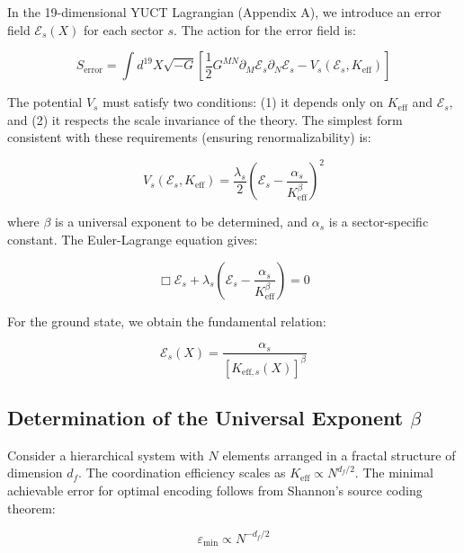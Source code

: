 \documentclass[12pt,a4paper]{article}
\theoremstyle{remark}
\newcommand{\Keff}{K_{\mathrm{eff}}}
\newcommand{\eps}{\varepsilon}
\newcommand{\df}{d_{\!f}}
\begin{document}
	In the 19-dimensional YUCT Lagrangian (Appendix A), we introduce an error field $\mathcal{E}_s(X)$ for each sector $s$. The action for the error field is:
	
	\begin{equation}
		S_{\text{error}} = \int d^{19}X \sqrt{-G} \left[ \frac{1}{2} G^{MN} \partial_M \mathcal{E}_s \partial_N \mathcal{E}_s - V_s(\mathcal{E}_s, \Keff) \right]
		\label{eq:error-action}
	\end{equation}
	
	The potential $V_s$ must satisfy two conditions: (1) it depends only on $\Keff$ and $\mathcal{E}_s$, and (2) it respects the scale invariance of the theory. The simplest form consistent with these requirements (ensuring renormalizability) is:
	
	\begin{equation}
		V_s(\mathcal{E}_s, \Keff) = \frac{\lambda_s}{2} \left( \mathcal{E}_s - \frac{\alpha_s}{\Keff^{\beta}} \right)^2
		\label{eq:error-potential}
	\end{equation}
	
	where $\beta$ is a universal exponent to be determined, and $\alpha_s$ is a sector-specific constant. The Euler-Lagrange equation gives:
	
	\begin{equation}
		\Box \mathcal{E}_s + \lambda_s \left( \mathcal{E}_s - \frac{\alpha_s}{\Keff^{\beta}} \right) = 0
		\label{eq:error-eom}
	\end{equation}
	
	For the ground state, we obtain the fundamental relation:
	
	\begin{equation}
		\mathcal{E}_s(X) = \frac{\alpha_s}{[K_{\mathrm{eff},s}(X)]^{\beta}}
		\label{eq:error-ground}
	\end{equation}
	
	\subsection{Determination of the Universal Exponent $\beta$}
	
	Consider a hierarchical system with $N$ elements arranged in a fractal structure of dimension $\df$. The coordination efficiency scales as $\Keff \propto N^{\df/2}$. The minimal achievable error for optimal encoding follows from Shannon's source coding theorem:
	
	\begin{equation}
		\eps_{\min} \propto N^{-\df/2}
		\label{eq:shannon-bound}
	\end{equation}
	
\end{document}
